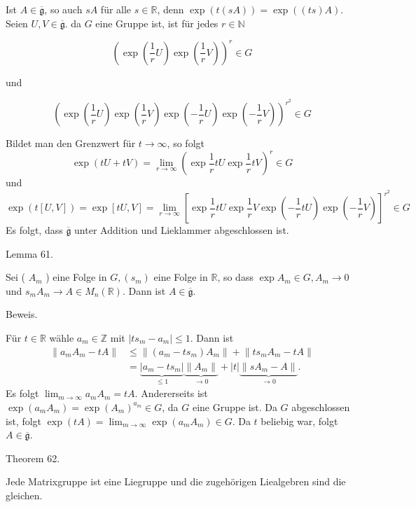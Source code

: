 \documentclass[10pt, letterpaper]{article}
\begin{document}
Ist $A \in \overline{\mathfrak{g}}$, so auch $s A$ für alle $s \in \mathbb{R}$, denn $\exp (t(s A))= \exp ((t s) A)$. Seien $U, V \in \overline{\mathfrak{g}}$. da $G$ eine Gruppe ist, ist für jedes $r \in \mathbb{N}$

$$
\left(\exp \left(\frac{1}{r} U\right) \exp \left(\frac{1}{r} V\right)\right)^{r} \in G
$$

und

$$
\left(\exp \left(\frac{1}{r} U\right) \exp \left(\frac{1}{r} V\right) \exp \left(-\frac{1}{r} U\right) \exp \left(-\frac{1}{r} V\right)\right)^{r^{2}} \in G
$$

Bildet man den Grenzwert für $t \rightarrow \infty$, so folgt
$$
\exp (t U+t V)=\lim _{r \rightarrow \infty}\left(\exp \frac{1}{r} t U \exp \frac{1}{r} t V\right)^{r} \in G
$$
und
$$\exp (t[U, V])=\exp [t U, V]=\lim _{r \rightarrow \infty}\left[\exp \frac{1}{r} t U \exp \frac{1}{r} V \exp \left(-\frac{1}{r} t U\right) \exp \left(-\frac{1}{r} V\right)\right]^{r^{2}} \in G$$
Es folgt, dass $\overline{\mathfrak{g}}$ unter Addition und Lieklammer abgeschlossen ist.



Lemma 61. 

Sei ( $A_{m}$ ) eine Folge in $G,\left(s_{m}\right)$ eine Folge in $\mathbb{R}$, so dass $\exp A_{m} \in G, A_{m} \rightarrow 0$ und $s_{m} A_{m} \rightarrow A \in M_{n}(\mathbb{R})$. Dann ist $A \in \overline{\mathfrak{g}}$.

Beweis. 

Für $t \in \mathbb{R}$ wähle $a_{m} \in \mathbb{Z}$ mit $\left|t s_{m}-a_{m}\right| \leq 1$. Dann ist
$$
\begin{aligned}
\left\|a_{m} A_{m}-t A\right\| & \leq\left\|\left(a_{m}-t s_{m}\right) A_{m}\right\|+\left\|t s_{m} A_{m}-t A\right\| \\
& =\underbrace{\left|a_{m}-t s_{m}\right|}_{\leq 1} \underbrace{\left\|A_{m}\right\|}_{\rightarrow 0}+|t| \underbrace{\left\|s A_{m}-A\right\|}_{\rightarrow 0} .
\end{aligned}
$$
Es folgt $\lim _{m \rightarrow \infty} a_{m} A_{m}=t A$. Andererseits ist $\exp \left(a_{m} A_{m}\right)=\exp \left(A_{m}\right)^{a_{m}} \in G$, da $G$ eine Gruppe ist. Da $G$ abgeschlossen ist, folgt $\exp (t A)= \lim _{m \rightarrow \infty} \exp \left(a_{m} A_{m}\right) \in G$. Da $t$ beliebig war, folgt $A \in \overline{\mathfrak{g}}$.




Theorem 62. 

Jede Matrixgruppe ist eine Liegruppe und die zugehörigen Liealgebren sind die gleichen.
\end{document}
